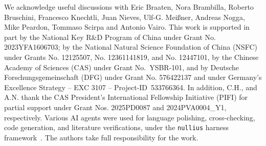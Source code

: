\documentclass[aps,prl,showpacs,amsmath,twocolumn,superscriptaddress,floatfix,nofootinbib,notitlepage]{revtex4-2}
\begin{document}
\bigskip


\acknowledgments
We acknowledge useful discussions with Eric Braaten, Nora Brambilla, Roberto Bruschini, Francesco Knechtli, Juan Nieves, Ulf-G. Mei\ss ner, Andreas Nogga, Mike Peardon, Tommaso Scirpa and Antonio Vairo.
This work is supported in part by the National Key R\&D Program of China under Grant No. 2023YFA1606703; by the National Natural Science Foundation of China (NSFC) under Grants No. 12125507, No. 12361141819, and No. 12447101, by the Chinese Academy of Sciences (CAS) under Grant No.~YSBR-101, and by
Deutsche Forschungsgemeinschaft (DFG) under Grant No. 576422137
and under Germany's Excellence Strategy -- EXC 3107 -- Project-ID~533766364. In addition, C.H., and A.N. thank the CAS President's International Fellowship Initiative (PIFI) for partial support under Grant Nos. 2025PD0087 and 2024PVA0004\_Y1, respectively.
Various AI agents were used for language polishing, cross-checking, code generation, and literature verifications, under the \texttt{nullius} harness framework~\cite{nullius}. The authors take full responsibility for the work.


\end{document}
